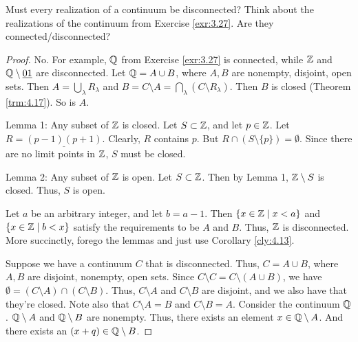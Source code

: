 \documentclass[../main.tex]{subfiles}
\begin{document}
\begin{exercise}\label{exr:4.24}
    Must every realization of a continuum be disconnected? Think about the realizations of the continuum from Exercise \ref{exr:3.27}. Are they connected/disconnected?
    \begin{proof}
        No. For example, $\mathbb{Q}$ from Exercise \ref{exr:3.27} is connected, while $\mathbb{Z}$ and $\mathbb{Q}\setminus\underline{01}$ are disconnected. Let $\mathbb{Q}=A\cup B$, where $A,B$ are nonempty, disjoint, open sets. Then $A=\bigcup_\lambda R_\lambda$ and $B=C\setminus A=\bigcap_\lambda(C\setminus R_\lambda)$. Then $B$ is closed (Theorem \ref{trm:4.17}). So is $A$.


        Lemma 1: Any subset of $\mathbb{Z}$ is closed.
        Let $S\subset\mathbb{Z}$, and let $p\in\mathbb{Z}$. Let $R=\underline{(p-1)(p+1)}$. Clearly, $R$ contains $p$. But $R\cap(S\setminus\{p\})=\emptyset$. Since there are no limit points in $\mathbb{Z}$, $S$ must be closed.

        Lemma 2: Any subset of $\mathbb{Z}$ is open.
        Let $S\subset\mathbb{Z}$. Then by Lemma 1, $\mathbb{Z}\setminus S$ is closed. Thus, $S$ is open.

        Let $a$ be an arbitrary integer, and let $b=a-1$. Then $\{x\in\mathbb{Z}\mid x<a\}$ and $\{x\in\mathbb{Z}\mid b<x\}$ satisfy the requirements to be $A$ and $B$. Thus, $\mathbb{Z}$ is disconnected. More succinctly, forego the lemmas and just use Corollary \ref{cly:4.13}.


        Suppose we have a continuum $C$ that is disconnected. Thus, $C=A\cup B$, where $A,B$ are disjoint, nonempty, open sets. Since $C\setminus C=C\setminus(A\cup B)$, we have $\emptyset=(C\setminus A)\cap(C\setminus B)$. Thus, $C\setminus A$ and $C\setminus B$ are disjoint, and we also have that they're closed. Note also that $C\setminus A=B$ and $C\setminus B=A$.
        Consider the continuum $\mathbb{Q}$. $\mathbb{Q}\setminus A$ and $\mathbb{Q}\setminus B$ are nonempty. Thus, there exists an element $x\in\mathbb{Q}\setminus A$. And there exists an $(x+q)\in\mathbb{Q}\setminus B$.\par\bigskip
    \end{proof}
\end{exercise}
\end{document}
